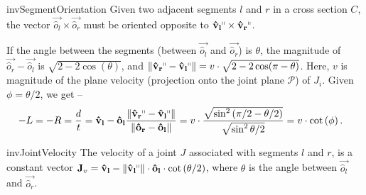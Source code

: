 \begin{restatable}{inv}{SegmentOrientation}
\label{inv:SegmentOrientation}
Given two adjacent segments $l$ and $r$ in a cross section $C$, the vector
$\vec{\hat o_l}\times \vec{\hat o_r}$ must be oriented opposite to $\vec{\hat v_l}^\shortparallel\times \vec{\hat v_r}^\shortparallel$.
\end{restatable}

If the angle between the segments (between $\vec{\hat o_l}$ and $\vec{\hat o_r}$) is $\theta$,
the magnitude of $\vec{\hat o_r}-\vec{\hat o_l}$ is $\sqrt{2-2\cos(\theta)}$,
and $ \left\| \vec{\hat v_r}^\shortparallel-\vec{\hat v_l}^\shortparallel\right\| = v\cdot\sqrt{2-2\cos(\pi-\theta)}$.
Here, $v$ is magnitude of the plane velocity (projection onto the joint plane $\mathcal P$) of $J_i$.
Given $\phi = \theta/2$, we get --
\begin{align*}
-L = -R &= \frac dt = \vec{\hat v_l} - \vec{\hat o_l}\frac{ \left\| \vec{\hat v_r}^\shortparallel
- \vec{\hat v_l}^\shortparallel\right\|}{ \left\| \vec{\hat o_r}-\vec{\hat o_l}\right\|}
= v\cdot\frac{\sqrt{\sin^2\left( {\pi/2-\theta/2}\right)}}{\sqrt{\sin^2{\theta/2}}}
= v\cdot\cot\left( \phi \right).
\end{align*}

\begin{restatable}{inv}{JointVelocity}
\label{inv:joint_velocity}
The velocity of a joint $J$ associated with segments $l$ and $r$, is a constant vector
$\vec J_v
= \vec{\hat v_l} - \left\| \vec{\hat v_l}^\shortparallel\right\|\cdot\vec{\hat o_l}\cdot\cot\left( \theta/2 \right)$,
where $\theta$ is the angle between $\vec{\hat o_l}$ and $\vec{\hat o_r}$.
\end{restatable}

